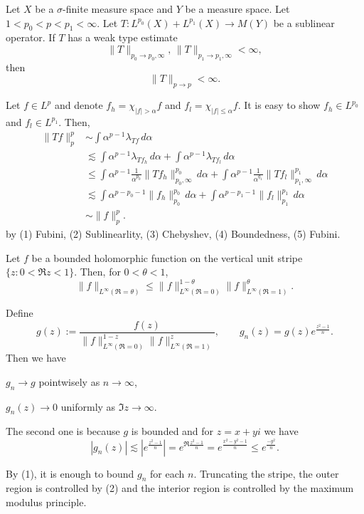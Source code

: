 \documentclass{../crs}
\begin{document}
\begin{thm}
Let $X$ be a $\sigma$-finite measure space and $Y$ be a measure space.
Let $1<p_0<p<p_1<\infty$.
Let $T\colon L^{p_0}(X)+L^{p_1}(X)\to M(Y)$ be a sublinear operator.
If $T$ has a weak type estimate
\[\|T\|_{p_0\to p_0,\infty},\,\|T\|_{p_1\to p_1,\infty}<\infty,\]
then
\[\|T\|_{p\to p}<\infty.\]
\end{thm}
\begin{pf}
Let $f\in L^p$ and denote $f_h=\chi_{|f|>\alpha}f$ and $f_l=\chi_{|f|\le\alpha}f$.
It is easy to show $f_h\in L^{p_0}$ and $f_l\in L^{p_1}$.
Then,
\begin{align*}
\|Tf\|_p^p&\sim\int\alpha^{p-1}\lambda_{Tf}\,d\alpha\\
&\lesssim\int\alpha^{p-1}\lambda_{Tf_h}\,d\alpha+\int\alpha^{p-1}\lambda_{Tf_l}\,d\alpha\\
&\le\int\alpha^{p-1}\frac1{\alpha^{p_0}}\|Tf_h\|_{p_0,\infty}^{p_0}\,d\alpha+\int\alpha^{p-1}\frac1{\alpha^{q_1}}\|Tf_l\|_{p_1,\infty}^{p_1}\,d\alpha\\
&\lesssim\int\alpha^{p-p_0-1}\|f_h\|_{p_0}^{p_0}\,d\alpha+\int\alpha^{p-p_1-1}\|f_l\|_{p_1}^{p_1}\,d\alpha\\
&\sim\|f\|_p^p.
\end{align*}
by (1) Fubini, (2) Sublinearlity, (3) Chebyshev, (4) Boundedness, (5) Fubini.
\end{pf}

\begin{thm}
Let $f$ be a bounded holomorphic function on the vertical unit stripe $\{z:0<\Re z<1\}$.
Then, for $0<\theta<1$,
\[\|f\|_{L^\infty(\Re=\theta)}\le\|f\|_{L^\infty(\Re=0)}^{1-\theta}\|f\|_{L^\infty(\Re=1)}^\theta.\]
\end{thm}
\begin{pf}
Define
\[g(z):=\frac{f(z)}{\|f\|_{L^\infty(\Re=0)}^{1-z}\|f\|_{L^\infty(\Re=1)}^z},\qquad g_n(z)=g(z)e^\frac{z^2-1}n.\]
Then we have
\begin{cond}
\item $g_n\to g$ pointwisely as $n\to\infty$,
\item $g_n(z)\to0$ uniformly as $\Im z\to\infty$.
\end{cond}
The second one is because $g$ is bounded and for $z=x+yi$ we have
\[|g_n(z)|\lesssim|e^\frac{z^2-1}n|=e^{\Re\frac{z^2-1}n}=e^\frac{x^2-y^2-1}n\le e^\frac{-y^2}n.\]

By (1), it is enough to bound $g_n$ for each $n$.
Truncating the stripe, the outer region is controlled by (2) and the interior region is controlled by the maximum modulus principle.
\end{pf}
\end{document}
